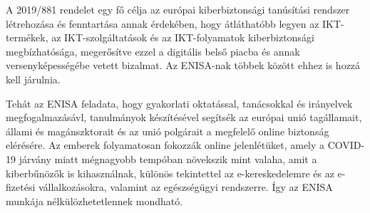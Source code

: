 A 2019/881 rendelet egy fő célja az európai kiberbiztonsági tanúsítási rendszer létrehozása és fenntartása annak érdekében, hogy átláthatóbb legyen az IKT-termékek, az IKT-szolgáltatások és az IKT-folyamatok kiberbiztonsági megbízhatósága, megerősítve ezzel a digitális belső piacba és annak versenyképességébe vetett bizalmat. Az ENISA-nak többek között ehhez is hozzá kell járulnia.

Tehát az ENISA feladata, hogy gyakorlati oktatással, tanácsokkal és irányelvek megfogalmazásávl, tanulmányok készítésével segítsék az európai unió tagállamait, állami és magánszktorait és az unió polgárait a megfelelő online biztonság elérésére. Az emberek folyamatosan fokozzák online jelenlétüket, amely a COVID-19 járvány miatt mégnagyobb tempóban növekszik mint valaha, amit a kiberbűnözők is kihasználnak, különös tekintettel az e-kereskedelemre és az e-fizetési vállalkozásokra, valamint az egészségügyi rendszerre. Így az ENISA munkája nélkülözhetetlennek mondható. \cite{ENISA-honlap, ENISA-osszefoglalo}